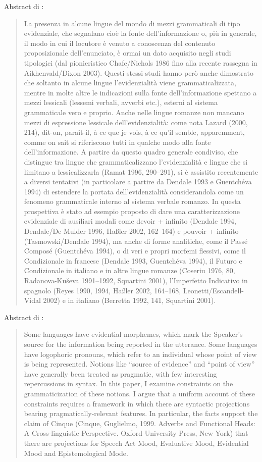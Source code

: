 \documentclass[twoside,stylearticle,11pt,filologia,it,article,bibsection]{spinoza}
\begin{document}
Abstract di :
\begin{quote}
La presenza in alcune lingue del mondo di mezzi grammaticali di tipo
evidenziale, che segnalano cioè la fonte dell'informazione o, più in
generale, il modo in cui il locutore è venuto a conoscenza del
contenuto proposizionale dell'enunciato, è ormai un dato acquisito
negli studi tipologici (dal pionieristico Chafe/Nichols 1986 fino alla
recente rassegna in Aikhenvald/Dixon 2003). Questi stessi studi hanno
però anche dimostrato che soltanto in alcune lingue l'evidenzialità
viene grammaticalizzata, mentre in molte altre le indicazioni sulla
fonte dell'informazione spettano a mezzi lessicali (lessemi verbali,
avverbi etc.), esterni al sistema grammaticale vero e proprio. Anche
nelle lingue romanze non mancano mezzi di espressione lessicale
dell'evidenzialità: come nota Lazard (2000, 214), dit-on, paraît-il, à
ce que je vois, à ce qu'il semble, apparemment, comme on sait si
riferiscono tutti in qualche modo alla fonte dell'informazione. A
partire da questo quadro generale condiviso, che distingue tra lingue
che grammaticalizzano l'evidenzialità e lingue che si limitano a
lessicalizzarla (Ramat 1996, 290–291), si è assistito recentemente a
diversi tentativi (in particolare a partire da Dendale 1993 e
Guentchéva 1994) di estendere la portata dell'evidenzialità
considerandola come un fenomeno grammaticale interno al sistema
verbale romanzo. In questa prospettiva è stato ad esempio proposto di
dare una caratterizzazione evidenziale di ausiliari modali come devoir
+ infinito (Dendale 1994, Dendale/De Mulder 1996, Haßler 2002,
162–164) e pouvoir + infinito (Tasmowski/Dendale 1994), ma anche di
forme analitiche, come il Passé Composé (Guentchéva 1994), o di veri e
propri morfemi flessivi, come il Condizionale in francese (Dendale
1993, Guentchéva 1994), il Futuro e Condizionale in italiano e in
altre lingue romanze (Coseriu 1976, 80, Radanova-Kuševa 1991–1992,
Squartini 2001), l'Imperfetto Indicativo in spagnolo (Reyes 1990,
1994, Haßler 2002, 164–168, Leonetti/Escandell-Vidal 2002) e in
italiano (Berretta 1992, 141, Squartini 2001).
\end{quote}

\clearpage

Abstract di :
\begin{quote}
Some languages have evidential morphemes, which mark the Speaker's source for the information being reported in the utterance. Some languages have logophoric pronouns, which refer to an individual whose point of view is being represented. Notions like “source of evidence” and “point of view” have generally been treated as pragmatic, with few interesting repercussions in syntax. In this paper, I examine constraints on the grammaticization of these notions. I argue that a uniform account of these constraints requires a framework in which there are syntactic projections bearing pragmatically-relevant features. In particular, the facts support the claim of Cinque (Cinque, Guglielmo, 1999. Adverbs and Functional Heads: A Cross-linguistic Perspective. Oxford University Press, New York) that there are projections for Speech Act Mood, Evaluative Mood, Evidential Mood and Epistemological Mode.
\end{quote}
\end{document}
